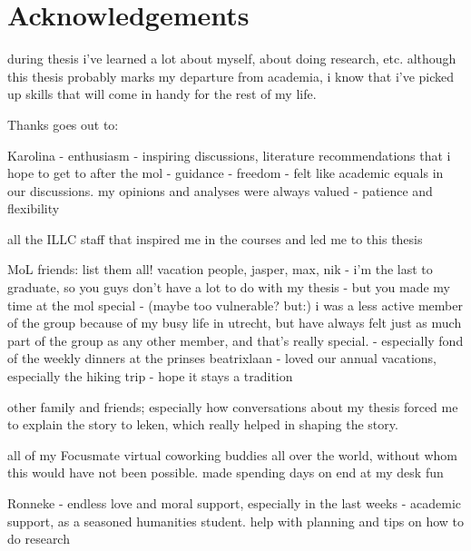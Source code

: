 \chapter*{Acknowledgements}

during thesis i've learned a lot about myself, about doing research, etc. although this thesis probably marks my departure from academia, i know that i've picked up skills that will come in handy for the rest of my life.

Thanks goes out to:

Karolina
- enthusiasm
- inspiring discussions, literature recommendations that i hope to get to after the mol
- guidance
- freedom
- felt like academic equals in our discussions. my opinions and analyses were always valued
- patience and flexibility

all the ILLC staff that inspired me in the courses and led me to this thesis

MoL friends: list them all! vacation people, jasper, max, nik
- i'm the last to graduate, so you guys don't have a lot to do with my thesis
- but you made my time at the mol special
- (maybe too vulnerable? but:) i was a less active member of the group because of my busy life in utrecht, but have always felt just as much part of the group as any other member, and that's really special.
- especially fond of the weekly dinners at the prinses beatrixlaan
- loved our annual vacations, especially the hiking trip
- hope it stays a tradition

other family and friends; especially how conversations about my thesis forced me to explain the story to leken, which really helped in shaping the story.

all of my Focusmate virtual coworking buddies all over the world, without whom this would have not been possible. made spending days on end at my desk fun

Ronneke
- endless love and moral support, especially in the last weeks
- academic support, as a seasoned humanities student. help with planning and tips on how to do research
